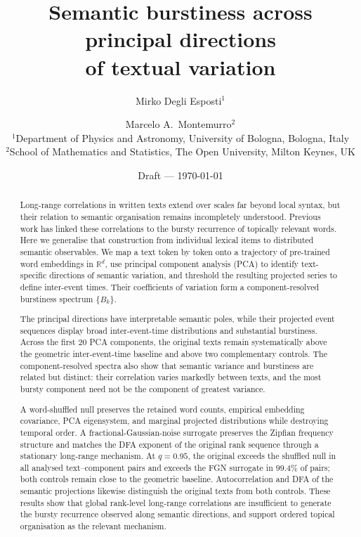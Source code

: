 \documentclass[12pt,a4paper]{article}
\newcommand{\R}{\mathbb{R}}
\begin{document}
\title{Semantic burstiness across principal directions\\
       of textual variation}

\author{Mirko Degli Esposti$^{1}$ \and Marcelo A.\ Montemurro$^{2}$\\[6pt]
  \small $^1$Department of Physics and Astronomy,
         University of Bologna, Bologna, Italy\\
  \small $^2$School of Mathematics and Statistics,
         The Open University, Milton Keynes, UK}

\date{\small Draft --- \today}

\maketitle

\begin{abstract}
Long-range correlations in written texts extend over scales far beyond
local syntax, but their relation to semantic organisation remains
incompletely understood.
Previous work has linked these correlations to the bursty recurrence of
topically relevant words.
Here we generalise that construction from individual lexical items to
distributed semantic observables.
We map a text token by token onto a trajectory of pre-trained word
embeddings in $\R^d$, use principal component analysis (PCA) to identify
text-specific directions of semantic variation, and threshold the
resulting projected series to define inter-event times.
Their coefficients of variation form a component-resolved burstiness
spectrum $\{B_k\}$.

The principal directions have interpretable semantic poles, while their
projected event sequences display broad inter-event-time distributions
and substantial burstiness.
Across the first 20 PCA components, the original texts remain
systematically above the geometric inter-event-time baseline and above
two complementary controls.
The component-resolved spectra also show that semantic variance and
burstiness are related but distinct: their correlation varies markedly
between texts, and the most bursty component need not be the component
of greatest variance.

A word-shuffled null preserves the retained word counts, empirical
embedding covariance, PCA eigensystem, and marginal projected
distributions while destroying temporal order.
A fractional-Gaussian-noise surrogate preserves the Zipfian frequency
structure and matches the DFA exponent of the original rank sequence
through a stationary long-range mechanism.
At $q=0.95$, the original exceeds the shuffled null in all analysed
text--component pairs and exceeds the FGN surrogate in $99.4\%$ of
pairs; both controls remain close to the geometric baseline.
Autocorrelation and DFA of the semantic projections likewise distinguish
the original texts from both controls.
These results show that global rank-level long-range correlations are
insufficient to generate the bursty recurrence observed along semantic
directions, and support ordered topical organisation as the relevant
mechanism.
\end{abstract}
\end{document}
